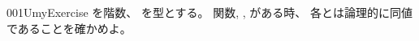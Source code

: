 \documentclass[index]{subfiles}
\begin{document}
\begin{myBlock}{001U}{myExercise}
  を階数、
  を型とする。
  関数,
  ,
  がある時、
  各とは論理的に同値であることを確かめよ。
\end{myBlock}
\end{document}
